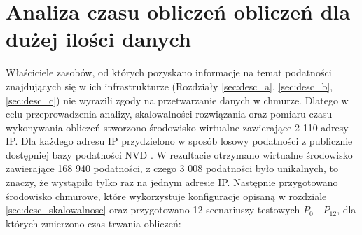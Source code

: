 \section{Analiza czasu obliczeń obliczeń dla dużej ilości danych}
\label{sec:analiza_skalowania}
Właściciele zasobów, od których pozyskano informacje na temat podatności znajdujących się w ich infrastrukturze (Rozdziały \ref{sec:desc_a}, \ref{sec:desc_b}, \ref{sec:desc_c}) nie wyrazili zgody na przetwarzanie danych w chmurze. Dlatego w celu przeprowadzenia analizy, skalowalności rozwiązania oraz pomiaru czasu wykonywania obliczeń stworzono środowisko wirtualne zawierające 2 110 adresy IP. Dla każdego adresu IP przydzielono w sposób losowy podatności z publicznie dostępniej bazy podatności NVD \cite{booth2013national}. W rezultacie otrzymano wirtualne środowisko zawierające 168 940 podatności, z czego 3 008 podatności było unikalnych, to znaczy, że wystąpiło tylko raz na jednym adresie IP. Następnie przygotowano środowisko chmurowe, które wykorzystuje konfiguracje opisaną w rozdziale \ref{sec:desc_skalowalnosc} oraz przygotowano 12 scenariuszy testowych $P_0$ - $P_{12}$, dla których zmierzono czas trwania obliczeń:

